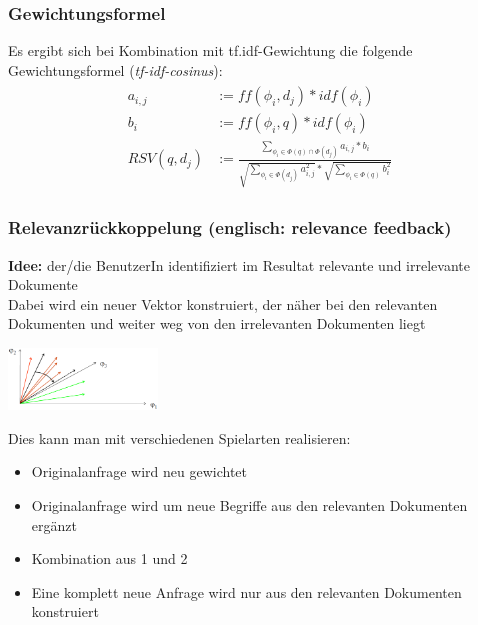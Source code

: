 \documentclass{report}
\newenvironment{Figure}
	{\par\medskip\noindent\minipage{\linewidth}}
	{\endminipage\par\medskip}
\theoremstyle{definition}
\theoremstyle{example}
\begin{document}
\subsubsection{Gewichtungsformel}
Es ergibt sich bei Kombination mit tf.idf-Gewichtung die folgende Gewichtungsformel (\textit{tf-idf-cosinus}):
\begin{eqnarray}
   \begin{split}
      a_{i,j} &:= ff(\phi_i, d_j) * idf(\phi_i)\\
      b_i &:= ff(\phi_i, q) * idf(\phi_i)\\
      RSV(q,d_j) &:= \frac{\sum_{\phi_i \in \Phi(q) \cap \Phi(d_j)} a_{i,j}*b_i}{\sqrt{\sum_{\phi_i \in \Phi(d_j)}a^2_{i,j}} * \sqrt{\sum_{\phi_i \in \Phi(q)}b^2_i}}
   \end{split}
\end{eqnarray}

\subsubsection{Relevanzrückkoppelung (englisch: relevance feedback)}
\textbf{Idee:} der/die BenutzerIn identifiziert im Resultat relevante und irrelevante Dokumente\\
Dabei wird ein neuer Vektor konstruiert, der näher bei den relevanten Dokumenten und weiter weg von den irrelevanten Dokumenten liegt
\begin{Figure}
   \centering
    \includegraphics[width=150px]{img/relevanceFeedback.png}
        \label{fig:neuer Vektor im relevance Feedback Prozess}
\end{Figure}

Dies kann man mit verschiedenen Spielarten realisieren:
\begin{itemize}
   \item Originalanfrage wird neu gewichtet
   \item Originalanfrage wird um neue Begriffe aus den relevanten Dokumenten ergänzt
   \item Kombination aus 1 und 2
   \item Eine komplett neue Anfrage wird nur aus den relevanten Dokumenten konstruiert
\end{itemize}
\end{document}
